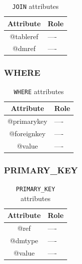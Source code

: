 \documentclass[11pt,a4paper]{ivoa}
\begin{document}
\begin{table}[!htbp]
\small
\centering
\begin{tabulary}{\linewidth}{|c|J|}       
       \hline 
            \textbf{Attribute} & 
            \textbf {Role}\\
       \hline         \hline  
             @tableref& 
            ---- \\
        \hline 
            @dmref & 
            ---- \\
        \hline 
     \end{tabulary}
     \caption{\texttt{JOIN} attributes} 
     \label{tbl:join-att}
 \end{table}



\FloatBarrier

\subsubsection{WHERE}

\begin{table}[!htbp]
\small
\centering
\begin{tabulary}{\linewidth}{|c|J|}       
       \hline 
            \textbf{Attribute} & 
            \textbf {Role}\\
       \hline         \hline  
             @primarykey& 
            ---- \\
        \hline 
            @foreignkey & 
            ---- \\
        \hline 
            @value & 
            ---- \\
        \hline 
     \end{tabulary}
     \caption{\texttt{WHERE} attributes} 
     \label{tbl:where-att}
 \end{table}


\FloatBarrier

\subsubsection{PRIMARY\_KEY}

\begin{table}[!htbp]
\small
\centering
\begin{tabulary}{\linewidth}{|c|J|}       
       \hline 
            \textbf{Attribute} & 
            \textbf {Role}\\
       \hline         \hline  
             @ref& 
            ---- \\
        \hline 
            @dmtype & 
            ---- \\
        \hline 
            @value & 
            ---- \\
        \hline 
     \end{tabulary}
     \caption{\texttt{PRIMARY\_KEY} attributes} 
     \label{tbl:primarykey-att}
 \end{table}
\end{document}
